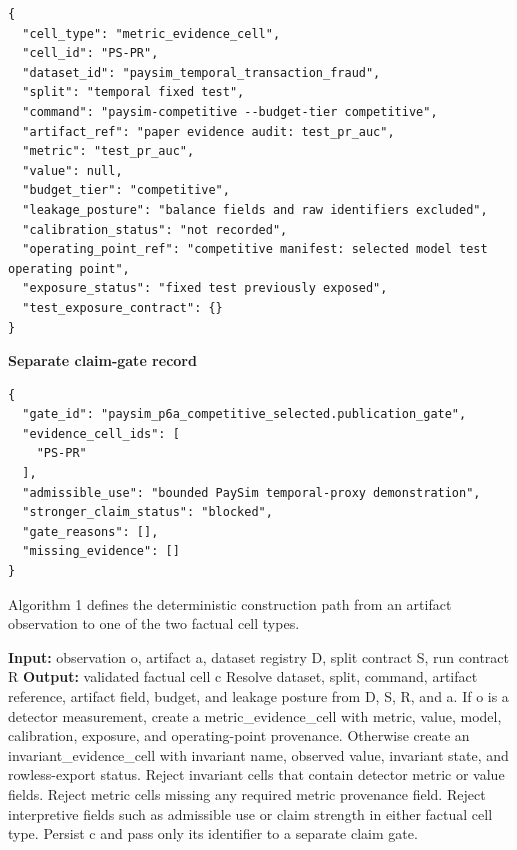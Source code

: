 \documentclass[11pt]{article}
\begin{document}
\begin{Verbatim}[frame=single,framesep=6pt,fontsize=\footnotesize,breaklines=true,breakanywhere=true]
{
  "cell_type": "metric_evidence_cell",
  "cell_id": "PS-PR",
  "dataset_id": "paysim_temporal_transaction_fraud",
  "split": "temporal fixed test",
  "command": "paysim-competitive --budget-tier competitive",
  "artifact_ref": "paper evidence audit: test_pr_auc",
  "metric": "test_pr_auc",
  "value": null,
  "budget_tier": "competitive",
  "leakage_posture": "balance fields and raw identifiers excluded",
  "calibration_status": "not recorded",
  "operating_point_ref": "competitive manifest: selected model test operating point",
  "exposure_status": "fixed test previously exposed",
  "test_exposure_contract": {}
}
\end{Verbatim}


\textbf{Separate claim-gate record}

\begin{Verbatim}[frame=single,framesep=6pt,fontsize=\footnotesize,breaklines=true,breakanywhere=true]
{
  "gate_id": "paysim_p6a_competitive_selected.publication_gate",
  "evidence_cell_ids": [
    "PS-PR"
  ],
  "admissible_use": "bounded PaySim temporal-proxy demonstration",
  "stronger_claim_status": "blocked",
  "gate_reasons": [],
  "missing_evidence": []
}
\end{Verbatim}


Algorithm 1 defines the deterministic construction path from an artifact observation to one of the two factual cell types.

\begin{algorithm}[H]
\caption{Typed evidence-cell creation}
\begin{algorithmic}[1]
\State \textbf{Input:} observation o, artifact a, dataset registry D, split contract S, run contract R
\State \textbf{Output:} validated factual cell c
\State Resolve dataset, split, command, artifact reference, artifact field, budget, and leakage posture from D, S, R, and a.
\State If o is a detector measurement, create a metric\_evidence\_cell with metric, value, model, calibration, exposure, and operating-point provenance.
\State Otherwise create an invariant\_evidence\_cell with invariant name, observed value, invariant state, and rowless-export status.
\State Reject invariant cells that contain detector metric or value fields.
\State Reject metric cells missing any required metric provenance field.
\State Reject interpretive fields such as admissible use or claim strength in either factual cell type.
\State Persist c and pass only its identifier to a separate claim gate.
\end{algorithmic}
\end{algorithm}
\end{document}
